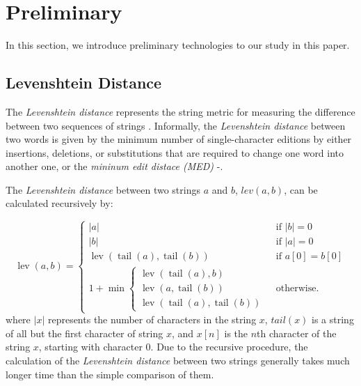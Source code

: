 \documentclass[technicalreport]{ieicej}
\begin{document}
\section{Preliminary}
\label{sec:preliminary}
    In this section, we introduce preliminary technologies to our study in this paper.

    \subsection{Levenshtein Distance}
        The {\em Levenshtein distance} represents the string metric for measuring the difference between two sequences of strings \cite{fuzzywuzzy-guidence}. Informally, the {\em Levenshtein distance} between two words is given by the minimum number of single-character editions by either insertions, deletions, or substitutions that are required to change one word into another one, or the {\em mininum edit distace (MED)} \cite{fuzzywuzzy-guidence}-\cite{levenshtein}.         

        The {\em Levenshtein distance} between two strings $a$ and $b$, $lev(a, b)$, can be calculated recursively by:

        \begin{equation}
                \operatorname{lev}(a, b)=\left\{\begin{array}{ll}
                |a| & \text { if }|b|=0 \\
                |b| & \text { if }|a|=0 \\
                \operatorname{lev}(\operatorname{tail}(a), \operatorname{tail}(b)) & \text { if } a[0]=b[0] \\
                1+\min \left\{\begin{array}{l}
                \operatorname{lev}(\operatorname{tail}(a), b) \\
                \operatorname{lev}(a, \operatorname{tail}(b)) \\
                \operatorname{lev}(\operatorname{tail}(a), \operatorname{tail}(b))
                \end{array}\right. & \text { otherwise. }
                \end{array}\right.
        \end{equation}
        where $|x|$ represents the number of characters in the string $x$, $tail(x)$ is a string of all but the first character of string $x$, and $x[n]$ is the $n$th character of the string $x$, starting with character 0. Due to the recursive procedure, the calculation of the {\em Levenshtein distance} between two strings generally takes much longer time than the simple comparison of them.
\end{document}
